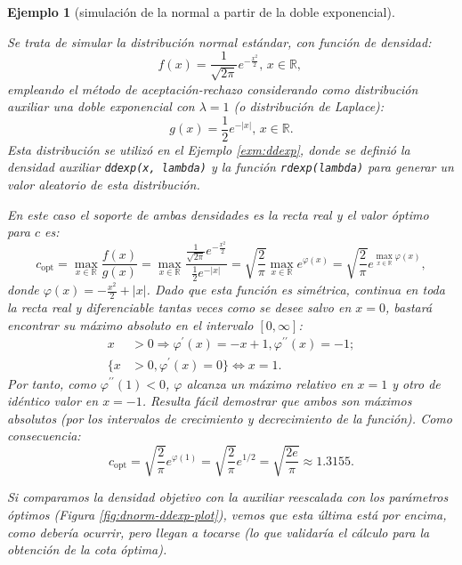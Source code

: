 \documentclass[
  10pt,
]{book}
\theoremstyle{break}
\newtheorem{example}{Ejemplo}[chapter]
\theoremstyle{nonumberplain}
\begin{document}
\begin{example}[simulación de la normal a partir de la doble exponencial]
\protect\hypertarget{exm:dnorm-ddexp-ar}{}\label{exm:dnorm-ddexp-ar}

Se trata de simular la distribución normal estándar, con función de densidad:
\[f(x)  =\frac{1}{\sqrt{2\pi}}e^{-\frac{x^{2}}{2}} \text{, } x\in\mathbb{R}\text{, }\]
empleando el método de aceptación-rechazo considerando como distribución auxiliar una doble exponencial con \(\lambda=1\) (o distribución de Laplace):
\[g(x)  =\frac{1}{2}e^{-\left| x \right|} \text{, } x\in\mathbb{R}.\]
Esta distribución se utilizó en el Ejemplo \ref{exm:ddexp}, donde se definió la densidad auxiliar \texttt{ddexp(x,\ lambda)} y la función \texttt{rdexp(lambda)} para generar un valor aleatorio de esta distribución.

En este caso el soporte de ambas densidades es la recta real y el valor óptimo para \(c\) es:
\[c_{\text{opt}} = \max_{x\in\mathbb{R}}\frac{f(x)}{g(x) } = \max_{x\in\mathbb{R}} \frac{\frac{1}{\sqrt{2\pi}}e^{-\frac{x^{2}}{2}}}{\frac{1}{2}e^{-\left| x\right|  }} = \sqrt{\frac{2}{\pi}}\max_{x\in\mathbb{R}}e^{\varphi(x)} = \sqrt{\frac{2}{\pi}}e^{\max_{x\in\mathbb{R}}\varphi(x)},\]
donde \(\varphi(x) = -\frac{x^{2}}{2}+\left| x \right|\).
Dado que esta función es simétrica, continua en toda la recta real y diferenciable tantas veces como se desee salvo en \(x=0\), bastará encontrar su máximo absoluto en el intervalo \([0,\infty]\):
\[\begin{aligned}
x  & >0\Rightarrow\varphi^{\prime}(x)  =-x+1,\varphi
^{\prime\prime}(x)  =-1;\\
\{x  & >0,\varphi^{\prime}(x)  =0\}\Leftrightarrow x=1.
\end{aligned}\]
Por tanto, como \(\varphi^{\prime\prime}(1) <0\), \(\varphi\) alcanza un máximo relativo en \(x=1\) y otro de idéntico valor en \(x=-1\).
Resulta fácil demostrar que ambos son máximos absolutos
(por los intervalos de crecimiento y decrecimiento de la función).
Como consecuencia:
\[c_{\text{opt}} = \sqrt{\frac{2}{\pi}}e^{\varphi(1)}
=\sqrt{\frac{2}{\pi}}e^{1/2} =\sqrt{\frac{2e}{\pi}} \approx 1.3155.\]

Si comparamos la densidad objetivo con la auxiliar reescalada con los parámetros óptimos (Figura \ref{fig:dnorm-ddexp-plot}), vemos que esta última está por encima, como debería ocurrir, pero llegan a tocarse (lo que validaría el cálculo para la obtención de la cota óptima).


\end{example}
\end{document}
